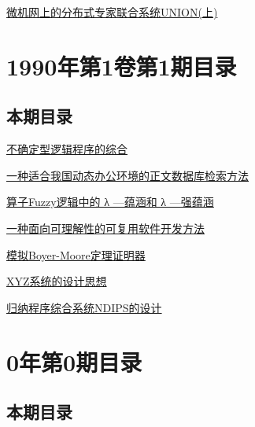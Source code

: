 \documentclass[a4paper]{article}
\begin{document}
\href{http://www.jos.org.cn/ch/reader/download_pdf.aspx?file_no=19900206&year_id=1990&quarter_id=2&falg=1}{微机网上的分布式专家联合系统UNION(上)}


\section{\textbf{1990年第1卷第1期目录}}
\subsection{本期目录}
\href{http://www.jos.org.cn/ch/reader/download_pdf.aspx?file_no=19900101&year_id=1990&quarter_id=1&falg=1}{不确定型逻辑程序的综合}

\href{http://www.jos.org.cn/ch/reader/download_pdf.aspx?file_no=19900102&year_id=1990&quarter_id=1&falg=1}{一种适合我国动态办公环境的正文数据库检索方法}

\href{http://www.jos.org.cn/ch/reader/download_pdf.aspx?file_no=19900103&year_id=1990&quarter_id=1&falg=1}{算子Fuzzy逻辑中的 λ —蕴涵和 λ —强蕴涵}

\href{http://www.jos.org.cn/ch/reader/download_pdf.aspx?file_no=19900104&year_id=1990&quarter_id=1&falg=1}{一种面向可理解性的可复用软件开发方法}

\href{http://www.jos.org.cn/ch/reader/download_pdf.aspx?file_no=19900105&year_id=1990&quarter_id=1&falg=1}{模拟Boyer-Moore定理证明器}

\href{http://www.jos.org.cn/ch/reader/download_pdf.aspx?file_no=19900106&year_id=1990&quarter_id=1&falg=1}{XYZ系统的设计思想}

\href{http://www.jos.org.cn/ch/reader/download_pdf.aspx?file_no=19900107&year_id=1990&quarter_id=1&falg=1}{归纳程序综合系统NDIPS的设计}


\section{\textbf{0年第0期目录}}
\subsection{本期目录}
\href{http://www.jos.org.cn/ch/reader/download_pdf.aspx?file_no=2013-02fm&year_id=0&quarter_id=0&falg=1}{}

\href{http://www.jos.org.cn/ch/reader/download_pdf.aspx?file_no=2013-03fm&year_id=0&quarter_id=0&falg=1}{}

\href{http://www.jos.org.cn/ch/reader/download_pdf.aspx?file_no=2013-05fm&year_id=0&quarter_id=0&falg=1}{}
\end{document}
